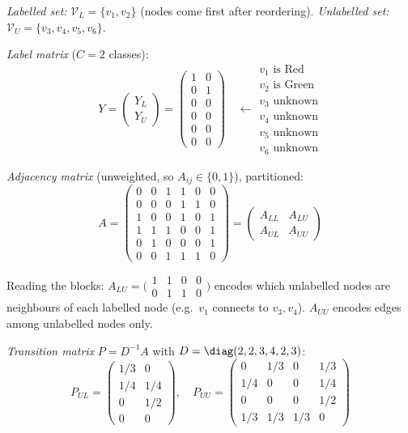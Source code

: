 \begin{notechapter}
\begin{example}
\emph{Labelled set:} $\mathcal{V}_L = \{v_1, v_2\}$ (nodes come first after
reordering). \emph{Unlabelled set:} $\mathcal{V}_U = \{v_3, v_4, v_5, v_6\}$.

\emph{Label matrix} ($C = 2$ classes):
\[
Y = \begin{pmatrix} Y_L \\ \hline Y_U \end{pmatrix}
= \left(\begin{array}{cc} 1 & 0 \\ 0 & 1 \\ \hline 0 & 0 \\ 0 & 0 \\
0 & 0 \\ 0 & 0 \end{array}\right)
\quad \leftarrow \begin{array}{l} v_1 \text{ is Red} \\ v_2 \text{ is Green} \\
v_3 \text{ unknown} \\ v_4 \text{ unknown} \\ v_5 \text{ unknown} \\
v_6 \text{ unknown} \end{array}
\]

\emph{Adjacency matrix} (unweighted, so $A_{ij} \in \{0,1\}$), partitioned:
\[
A = \left(\begin{array}{cc|cccc}
0 & 0 & 1 & 1 & 0 & 0 \\
0 & 0 & 0 & 1 & 1 & 0 \\
\hline
1 & 0 & 0 & 1 & 0 & 1 \\
1 & 1 & 1 & 0 & 0 & 1 \\
0 & 1 & 0 & 0 & 0 & 1 \\
0 & 0 & 1 & 1 & 1 & 0
\end{array}\right)
= \begin{pmatrix} A_{LL} & A_{LU} \\ A_{UL} & A_{UU} \end{pmatrix}
\]

Reading the blocks: $A_{LU} = \bigl(\begin{smallmatrix} 1&1&0&0 \\ 0&1&1&0
\end{smallmatrix}\bigr)$ encodes which unlabelled nodes are neighbours of each
labelled node (e.g.\ $v_1$ connects to $v_3, v_4$). $A_{UU}$ encodes edges
among unlabelled nodes only.

\emph{Transition matrix} $P = D^{-1}A$ with $D = \diag(2, 2, 3, 4, 2, 3)$:
\[
P_{UL} = \begin{pmatrix} 1/3 & 0 \\ 1/4 & 1/4 \\ 0 & 1/2 \\ 0 & 0 \end{pmatrix},
\quad
P_{UU} = \begin{pmatrix} 0 & 1/3 & 0 & 1/3 \\ 1/4 & 0 & 0 & 1/4 \\
0 & 0 & 0 & 1/2 \\ 1/3 & 1/3 & 1/3 & 0 \end{pmatrix}
\]


\end{example}
\end{notechapter}
